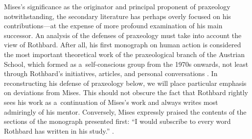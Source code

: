 Mises's significance as the originator and principal proponent of praxeology notwithstanding, the secondary literature has perhaps overly focused on his contributions---at the expense of more profound examination of his main successor. An analysis of the defenses of praxeology must take into account the view of Rothbard. After all, his first monograph on human action 
\parencites[][]{rothbard_man_1962}[][]{rothbard_man_2009} %
 is considered the most important theoretical work of the praxeological branch of the Austrian School, which formed as a~self-conscious group from the 1970s onwards, not least through Rothbard's initiatives, articles, and personal conversations 
\parencites[][pp.122–124]{gordon_essential_2007}[][]{holcombe_advanced_2014}[][]{}[][]{white_methodology_1977}[][pp.26–27]{white_methodology_2003}. %
 In reconstructing his defense of praxeology below, we will place particular emphasis on deviations from Mises. This should not obscure the fact that Rothbard rightly sees his work as a~continuation of Mises's work and always writes most admiringly of his mentor. Conversely, Mises expressly praised the contents of the sections of the monograph presented first: ``I would subscribe to every word Rothbard has written in his study.'' 
\parencites[see][p.158]{mises_my_1976}[cf. also][p.2]{gordon_who_2008}.%




